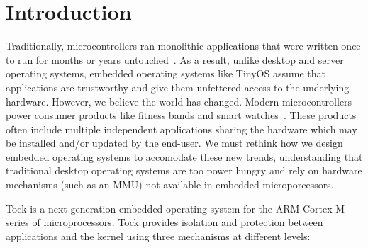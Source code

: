 \section{Introduction}

Traditionally, microcontrollers ran monolithic applications that were written
once to run for months or years untouched~. As a result,
unlike desktop and server operating systems, embedded operating systems like
TinyOS assume that applications are trustworthy and give them unfettered
access to the underlying hardware. However, we believe the world has changed.
Modern microcontrollers power consumer products like fitness bands and smart
watches~. These products often
include multiple independent applications sharing the hardware which may be
installed and/or updated by the end-user. We must rethink how we design
embedded operating systems to accomodate these new trends, understanding that
traditional desktop operating systems are too power hungry and rely on
hardware mechanisms (such as an MMU) not available in embedded
microporcessors.

Tock is a next-generation embedded operating system for the ARM Cortex-M
series of microprocessors. Tock provides isolation and protection between
applications and the kernel using three mechanisms at different levels:

